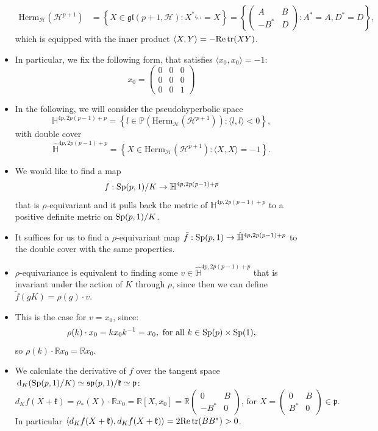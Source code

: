 \documentclass{report}
\begin{document}
\begin{itemize}
    \begin{align*}
        \mathrm{Herm}_\mathcal H (\mathcal H^{p+1}) &= \left\{ X \in \mathfrak{gl}(p+1, \mathcal H) : X^{*_{I_{p,1}}} = X \right\} =
        \left\{
        \begin{pmatrix}
            A & B \\
            -B^* & D
        \end{pmatrix} : A^* = A, D^* = D
        \right\},
    \end{align*}
    which is equipped with the inner product $\langle X, Y \rangle = -\mathrm{Re}\operatorname{tr}(XY)$.
    \item In particular, we fix the following form, that satisfies $\langle x_0, x_0 \rangle = -1$:
    \[
    x_0 = \begin{pmatrix}
        0 & 0 & 0 \\
        0 & 0 & 0 \\
        0 & 0 & 1
    \end{pmatrix}
    \]
    \item In the following, we will consider the pseudohyperbolic space
    \[
    \mathbb H^{4p, 2p(p-1)+p} = \left\{ l \in \mathbb P(\mathrm{Herm}_\mathcal H(\mathcal H^{p+1})) : \langle l, l\rangle < 0 \right\},
    \]
    with double cover 
    \[
    \hat{\mathbb H}^{4p, 2p(p-1)+p} = \left\{ X \in \mathrm{Herm}_\mathcal H(\mathcal H^{p+1}) : \langle X, X\rangle = -1 \right\}.
    \]
    \item We would like to find a map
    \[
    f : \operatorname{{\mathrm{Sp}}}(p,1)/K \to \mathbb H^{4p, 2p(p-1)+p}
    \]
    that is $\rho$-equivariant and it pulls back the metric of $\mathbb H^{4p, 2p(p-1)+p}$ to a positive definite metric on $\operatorname{{\mathrm{Sp}}}(p,1)/K$.
    \item It suffices for us to find a $\rho$-equivariant map $\tilde f: \operatorname{{\mathrm{Sp}}}(p,1) \to \hat{\mathbb H}^{4p, 2p(p-1)+p}$ to the double cover with the same properties.
    \item $\rho$-equivariance is equivalent to finding some $v \in \hat{\mathbb H}^{4p, 2p(p-1)+p}$ that is invariant under the action of $K$ through $\rho$, since then we can define $\tilde f(gK) = \rho(g)\cdot v$.
    \item This is the case for $v = x_0$, since:
    \[
    \rho(k) \cdot x_0 = k x_0 k^{-1} = x_0, \text{ for all } k \in \operatorname{{\mathrm{Sp}}}(p) \times \operatorname{{\mathrm{Sp}}}(1),
    \] 
    so $\rho(k) \cdot \mathbb R x_0 = \mathbb R x_0$.
    \item We calculate the derivative of $f$ over the tangent space $\,\mathrm{d}_K (\operatorname{{\mathrm{Sp}}}(p,1)/K) \simeq \mathfrak{sp}(p,1) / \mathfrak k \simeq \mathfrak p$:
    \[
    d_K f(X + \mathfrak k) = \rho_*(X) \cdot \mathbb R x_0 = \mathbb R [X, x_0] = \mathbb R \begin{pmatrix}
        0 & B \\
        -B^* & 0
    \end{pmatrix}
    \text{, for } X = \begin{pmatrix}
        0 & B \\
        B^* & 0
    \end{pmatrix}
    \in \mathfrak p.
    \]
    In particular $\langle d_K f(X + \mathfrak k), d_K f(X + \mathfrak k) \rangle = 2\mathrm{Re}\operatorname{tr}(B B^*) > 0$.
\end{itemize}
\end{document}
